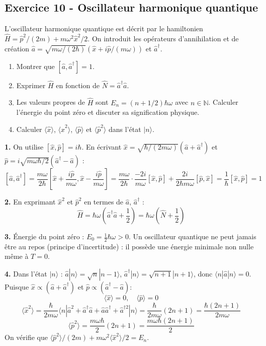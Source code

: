 \documentclass[12pt,a4paper]{article}
\begin{document}
\subsection*{Exercice 10 - Oscillateur harmonique quantique \niveau{\difficile}}

\begin{boiteexercice}
L'oscillateur harmonique quantique est décrit par le hamiltonien $\hat{H} = \hat{p}^2/(2m) + m\omega^2\hat{x}^2/2$. On introduit les opérateurs d'annihilation et de création $\hat{a} = \sqrt{m\omega/(2\hbar)}(\hat{x} + i\hat{p}/(m\omega))$ et $\hat{a}^\dagger$.
\begin{enumerate}
  \item Montrer que $[\hat{a},\hat{a}^\dagger] = 1$.
  \item Exprimer $\hat{H}$ en fonction de $\hat{N} = \hat{a}^\dagger\hat{a}$.
  \item Les valeurs propres de $\hat{H}$ sont $E_n = (n+1/2)\hbar\omega$ avec $n\in\mathbb{N}$. Calculer l'énergie du point zéro et discuter sa signification physique.
  \item Calculer $\langle\hat{x}\rangle$, $\langle\hat{x}^2\rangle$, $\langle\hat{p}\rangle$ et $\langle\hat{p}^2\rangle$ dans l'état $|n\rangle$.
\end{enumerate}
\end{boiteexercice}

\begin{boitecorrige}
\textbf{1.} On utilise $[\hat{x},\hat{p}] = i\hbar$. En écrivant $\hat{x} = \sqrt{\hbar/(2m\omega)}(\hat{a}+\hat{a}^\dagger)$ et $\hat{p} = i\sqrt{m\omega\hbar/2}(\hat{a}^\dagger-\hat{a})$ :
\[
[\hat{a},\hat{a}^\dagger] = \frac{m\omega}{2\hbar}[\hat{x}+\frac{i\hat{p}}{m\omega}, \hat{x}-\frac{i\hat{p}}{m\omega}] = \frac{m\omega}{2\hbar}\cdot\frac{-2i}{m\omega}[\hat{x},\hat{p}] + \frac{2i}{2\hbar m\omega}[\hat{p},\hat{x}] = \frac{1}{\hbar}[\hat{x},\hat{p}] = 1
\]

\textbf{2.} En exprimant $\hat{x}^2$ et $\hat{p}^2$ en termes de $\hat{a}$, $\hat{a}^\dagger$ :
\[
\hat{H} = \hbar\omega\!\left(\hat{a}^\dagger\hat{a}+\frac{1}{2}\right) = \hbar\omega\!\left(\hat{N}+\frac{1}{2}\right)
\]

\textbf{3.} Énergie du point zéro : $E_0 = \frac{1}{2}\hbar\omega > 0$. Un oscillateur quantique ne peut jamais être au repos (principe d'incertitude) : il possède une énergie minimale non nulle même à $T = 0$.

\textbf{4.} Dans l'état $|n\rangle$ : $\hat{a}|n\rangle = \sqrt{n}|n-1\rangle$, $\hat{a}^\dagger|n\rangle = \sqrt{n+1}|n+1\rangle$, donc $\langle n|\hat{a}|n\rangle = 0$. Puisque $\hat{x} \propto (\hat{a}+\hat{a}^\dagger)$ et $\hat{p} \propto (\hat{a}^\dagger-\hat{a})$:
\[
\langle\hat{x}\rangle = 0, \quad \langle\hat{p}\rangle = 0
\]
\[
\langle\hat{x}^2\rangle = \frac{\hbar}{2m\omega}\langle n|\hat{a}^2+\hat{a}^\dagger\hat{a}+\hat{a}\hat{a}^\dagger+\hat{a}^{\dagger2}|n\rangle = \frac{\hbar}{2m\omega}(2n+1) = \frac{\hbar(2n+1)}{2m\omega}
\]
\[
\langle\hat{p}^2\rangle = \frac{m\omega\hbar}{2}(2n+1) = \frac{m\omega\hbar(2n+1)}{2}
\]
On vérifie que $\langle\hat{p}^2\rangle/(2m) + m\omega^2\langle\hat{x}^2\rangle/2 = E_n$.
\end{boitecorrige}
\end{document}
